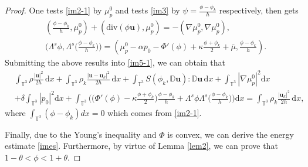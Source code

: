 \documentclass[reqno,a4paper,11pt]{amsart}
\theoremstyle{plain}
\numberwithin{equation}{section}
\begin{document}
\begin{proof}
	
	
	
	One tests \eqref{im2-1} by $\mu_{p}^{0}$  and tests  \eqref{im3} by $\psi=\frac{\phi-\phi_{k}}{h}$ respectively, then gets
	\begin{align}
		&\label{im54}(\frac{\phi-\phi_{k}}{h},\mu_{p}^{0})+(\mathrm{div}(\phi\mathbf{u}),\mu_{p}^{0})= -(\nabla \mu_{p}^{0},\nabla\mu_{p}^{0}),
		\\\label{im7}
		&\bigg(\Lambda^{s}\phi,\Lambda^{s}\big(\frac{\phi-\phi_{k}}{h}\big)\bigg)=(\mu_{p}^{0}-\alpha p_{0}-\Phi'(\phi)+\kappa\frac{\phi+\phi_{k}}{2}+\overline{\mu},\frac{\phi-\phi_{k}}{h}).
	\end{align}
	Submitting the above results into \eqref{im5-1}, we can obtain that
	\begin{align*}
		&\nonumber \int_{\mathbb{T}^{3}} \rho\frac{|\mathbf{u}|^{2}}{2h}\,\mathrm dx + \int_{\mathbb{T}^{3}} \rho_{k}\frac{|\mathbf{u}-\mathbf{u}_{k}|^{2}}{2h}\,\mathrm dx +\int_{\mathbb{T}^{3}}S(\phi_{k},\mathbb{ D}\mathbf{u}):\mathbb{ D}\mathbf{u}\,\mathrm dx +\int_{\mathbb{T}^{3}}|\nabla \mu_{p}^{0}|^{2}\mathrm dx
		\\&+\delta\int_{\mathbb{T}^{3}}|p_{0}|^{2}\mathrm dx
		+\int_{\mathbb{T}^{3}}\bigg(\big(\Phi'(\phi)-\kappa\frac{\phi+\phi_{k}}{2}\big)\frac{\phi-\phi_{k}}{h}+\Lambda^{s}\phi\Lambda^{s}\big(\frac{\phi-\phi_{k}}{h}\big)\bigg)\mathrm dx
		=\int_{\mathbb{T}^{3}} \rho_{k}\frac{|\mathbf{u}_{k}|^{2}}{2h}\,\mathrm dx,
	\end{align*}
	where $\int_{\mathbb{T}^{3}}(\phi-\phi_{k})dx=0$ which comes from \eqref{im2-1}.
	
	Finally, due to the Young's inequality and $\Phi$ is convex, we can derive the energy estimate \eqref{imes}. Furthermore, by virtue of Lemma \ref{lem2}, we can prove that $1-\theta<\phi<1+\theta$.
	

\end{proof}
\end{document}
